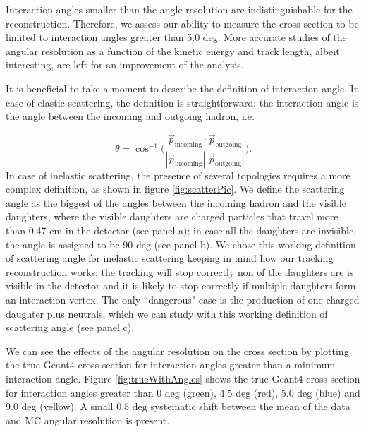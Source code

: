 Interaction angles smaller than the angle resolution are indistinguishable for the reconstruction. Therefore, we assess our ability to measure the cross section to be limited to interaction angles greater than 5.0 deg. More accurate studies of the angular resolution as a function of the kinetic energy and track length, albeit interesting, are left for an improvement of the analysis. 

It is beneficial to take a moment to describe the definition of interaction angle. In case of elastic scattering, the definition is straightforward: the interaction angle is the angle between the incoming and outgoing hadron, i.e.

\begin{equation}  
\theta = \cos^{-1} \Big(\frac{\vec p _{\text{incoming}}  \cdot\vec p _{\text{outgoing}}}{|\vec p _{\text{incoming}}|  |\vec p _{\text{outgoing}}| }\Big).
\end{equation}   
In case of inelastic scattering,  the presence of several topologies requires a more complex definition, as shown in figure \ref{fig:scatterPic}.  We define the scattering angle as the biggest of the angles between the incoming hadron and the visible daughters, where the visible daughters are charged particles that travel more than 0.47 cm in the detector (see panel a); in case all the daughters are invisible, the angle is assigned to be 90 deg (see panel b). We chose this working definition of scattering angle for inelastic scattering keeping in mind how our tracking reconstruction works: the tracking will stop correctly non of the daughters are is visible in the detector and it is likely to stop correctly if multiple daughters form an interaction vertex. The only ``dangerous" case is the production of one charged daughter plus neutrals, which we can study with this working definition of scattering angle (see panel c).


We can see the effects of the angular resolution on the cross section by plotting the true Geant4 cross section for interaction angles greater than a minimum interaction angle. Figure \ref{fig:trueWithAngles} shows the  true Geant4 cross section  for interaction angles greater than 0 deg (green), 4.5 deg (red), 5.0 deg  (blue) and 9.0 deg (yellow). 
A small $0.5 \text{ deg}$ systematic shift between the mean of the data and MC angular resolution is present.%


